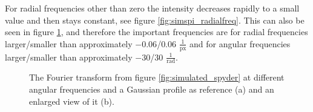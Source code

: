 For radial frequencies other than zero the intensity decreases rapidly to a small value and then stays constant, see figure \ref{fig:simspi_radialfreq}. This can also be seen in figure \ref{fig:simspi_angularfreq}, and therefore the important frequencies are for radial frequencies larger/smaller than approximately $-0.06$/$0.06$ $\frac{1}{\mathrm{px}}$ and for angular frequencies larger/smaller than approximately $-30$/$30$ $\frac{1}{\mathrm{rad}}$.
\begin{figure}[H]
	\centering
\caption{The Fourier transform from figure \ref{fig:simulated_spyder} at different angular frequencies and a Gaussian profile as reference (a) and an enlarged view of it (b). }
\label{fig:simspi_angularfreq}
\end{figure}

